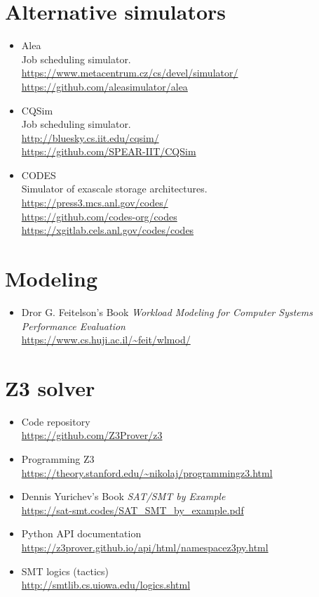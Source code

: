 \documentclass[thesis-en.tex]{subfiles}
\begin{document}
\section{Alternative simulators}
\begin{itemize}
    \item Alea\\
    Job scheduling simulator.\\
    \url{https://www.metacentrum.cz/cs/devel/simulator/}\\
    \url{https://github.com/aleasimulator/alea}
    \item CQSim\\
    Job scheduling simulator.\\
    \url{http://bluesky.cs.iit.edu/cqsim/}\\
    \url{https://github.com/SPEAR-IIT/CQSim}
    \item CODES\\
    Simulator of exascale storage architectures.\\
    \url{https://press3.mcs.anl.gov/codes/}\\
    \url{https://github.com/codes-org/codes}\\
    \url{https://xgitlab.cels.anl.gov/codes/codes}
\end{itemize}

\section{Modeling}
\begin{itemize}
    \item Dror G. Feitelson's Book \textit{Workload Modeling for Computer Systems Performance Evaluation}\\
    \url{https://www.cs.huji.ac.il/~feit/wlmod/}
\end{itemize}

\section{Z3 solver}
\begin{itemize}
    \item Code repository\\
    \url{https://github.com/Z3Prover/z3}
    \item Programming Z3\\
    \url{https://theory.stanford.edu/~nikolaj/programmingz3.html}
    \item Dennis Yurichev's Book \textit{SAT/SMT by Example}\\
    \url{https://sat-smt.codes/SAT_SMT_by_example.pdf}
    \item Python API documentation\\
    \url{https://z3prover.github.io/api/html/namespacez3py.html}
    \item SMT logics (tactics)\\
    \url{http://smtlib.cs.uiowa.edu/logics.shtml}
\end{itemize}
\end{document}
